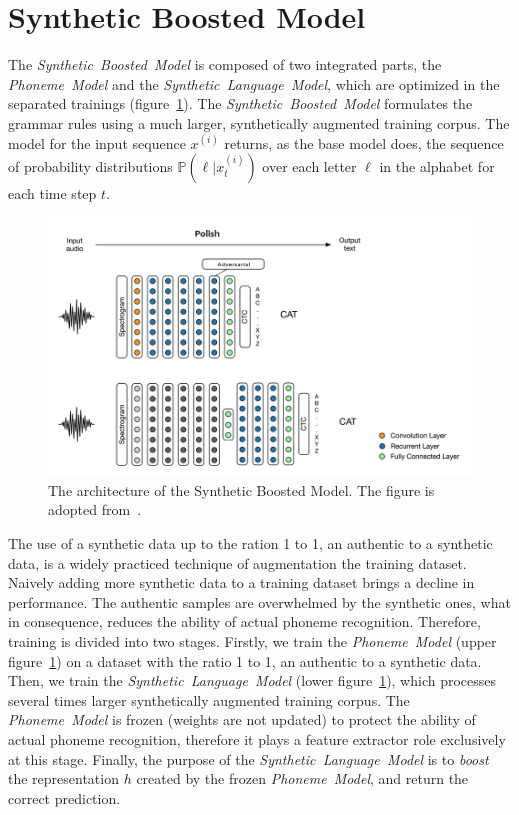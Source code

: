 \section{Synthetic Boosted Model}\label{sec:synthetic-boosted-model}

The \textit{Synthetic~Boosted~Model} is composed of two integrated parts, the \textit{Phoneme~Model}
and the \textit{Synthetic~Language~Model}, which are optimized in the separated trainings
(figure~\ref{fig:synthetic_boosted_model}).
The \textit{Synthetic~Boosted~Model} formulates the grammar rules using a much larger,
synthetically augmented training corpus.
The model for the input sequence $x^{(i)}$ returns, as the base model does, the sequence of probability
distributions $\mathbb{P}(\ell | x^{(i)}_t)$ over each letter $\ell$ in the alphabet for each time step $t$.

\begin{figure}[!h]
    \centering
    \includegraphics[width=12cm]{figures/synthetic_boosted_model.png}
    \caption{
The architecture of the Synthetic Boosted Model.
The figure is adopted from~\cite{ryan2016}.
}
\label{fig:synthetic_boosted_model}
\end{figure}

The use of a synthetic data up to the ration 1 to 1, an authentic to a synthetic data,
is a widely practiced technique of augmentation the training dataset.
Naively adding more synthetic data to a training dataset brings a decline in performance.
The authentic samples are overwhelmed by the synthetic ones, what in consequence,
reduces the ability of actual phoneme recognition.
Therefore, training is divided into two stages.
Firstly, we train the \textit{Phoneme~Model} (upper figure~\ref{fig:synthetic_boosted_model})
on a dataset with the ratio 1 to 1, an authentic to a synthetic data.
Then, we train the \textit{Synthetic~Language~Model} (lower figure~\ref{fig:synthetic_boosted_model}),
which processes several times larger synthetically augmented training corpus.
The \textit{Phoneme~Model} is frozen (weights are not updated) to protect the ability
of actual phoneme recognition, therefore it plays a feature extractor role exclusively at this stage.
Finally, the purpose of the \textit{Synthetic~Language~Model} is to \textit{boost}
the representation $h$ created by the frozen \textit{Phoneme~Model}, and return
the correct prediction.


